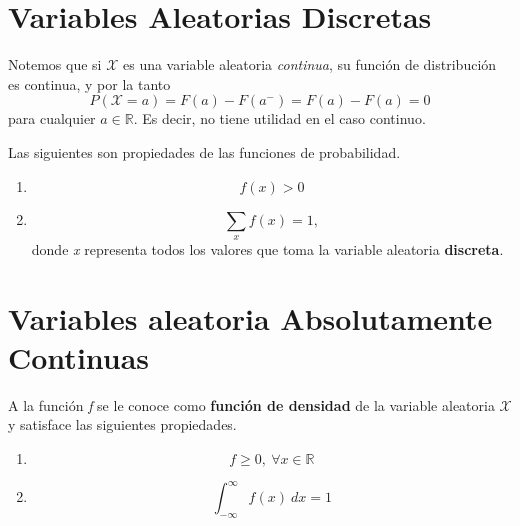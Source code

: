 \section{Variables Aleatorias Discretas}

\noindent Notemos que si $\mathcal X$ es una variable aleatoria \textit{continua}, su función de distribución es continua, y por la tanto
\[P(\mathcal X = a) = F(a) - F(a^-) = F(a) - F(a) = 0\]
para cualquier $a \in \mathbb R$. Es decir, no tiene utilidad en el caso continuo.

Las siguientes son propiedades de las funciones de probabilidad.
\begin{enumerate}
  \item \[f(x) > 0\]
  \item \[\sum_x f(x) = 1,\] donde \textit x representa todos los valores que toma la variable aleatoria \textbf{discreta}.
\end{enumerate}

\section{Variables aleatoria Absolutamente Continuas}

A la función \textit f se le conoce como \textbf{función de densidad} de la variable aleatoria $\mathcal X$ y satisface las siguientes propiedades.

\begin{enumerate}
  \item \[ f \ge 0, ~ \forall x \in \mathbb R \]
  \item \[ \int_{-\infty}^{\infty}f(x)~dx = 1 \]
\end{enumerate}


